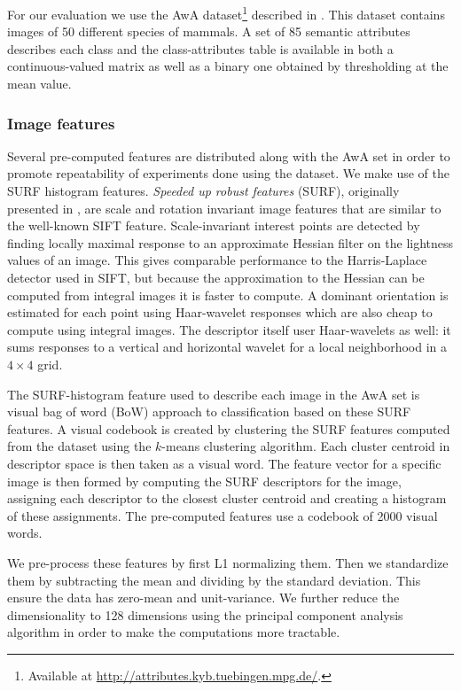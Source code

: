For our evaluation we use the \acf{AwA} dataset\footnote{Available at \url{http://attributes.kyb.tuebingen.mpg.de/}.} described in \cite{lampert2009learning, lampert2014attribute}. This dataset contains images of 50 different species of mammals. A set of 85 semantic attributes describes each class and the class-attributes table is available in both a continuous-valued matrix as well as a binary one obtained by thresholding at the mean value.

\subsubsection{Image features}

Several pre-computed features are distributed along with the \ac{AwA} set in order to promote repeatability of experiments done using the dataset. We make use of the SURF histogram features. \emph{Speeded up robust features} (SURF), originally presented in \cite{bay2006surf}, are scale and rotation invariant image features that are similar to the well-known SIFT feature. \cite{lowe2004distinctive} Scale-invariant interest points are detected by finding locally maximal response to an approximate Hessian filter on the lightness values of an image. This gives comparable performance to the Harris-Laplace detector used in SIFT, but because the approximation to the Hessian can be computed from integral images it is faster to compute. A dominant orientation is estimated for each point using Haar-wavelet responses which are also cheap to compute using integral images. The descriptor itself user Haar-wavelets as well: it sums responses to a vertical and horizontal wavelet for a local neighborhood in a $4 \times 4$ grid.

The SURF-histogram feature used to describe each image in the \ac{AwA} set is visual bag of word (BoW) approach to classification based on these SURF features. A visual codebook is created by clustering the SURF features computed from the dataset using the $k$-means clustering algorithm. Each cluster centroid in descriptor space is then taken as a visual word. The feature vector for a specific image is then formed by computing the SURF descriptors for the image, assigning each descriptor to the closest cluster centroid and creating a histogram of these assignments. The pre-computed features use a codebook of 2000 visual words.

We pre-process these features by first L1 normalizing them. Then we standardize them by subtracting the mean and dividing by the standard deviation. This ensure the data has zero-mean and unit-variance. We further reduce the dimensionality to 128 dimensions using the principal component analysis algorithm in order to make the computations more tractable.

